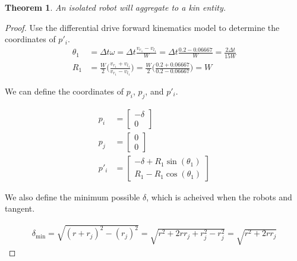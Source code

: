 \documentclass[conference]{IEEEtran}
\newtheorem{theorem}{Theorem}
\begin{document}
  \begin{theorem} \label{thm:aggregation_with_kin}
    An isolated robot will aggregate to a kin entity.
  \end{theorem}
  \begin{proof}
    Use the differential drive forward kinematics model to determine the coordinates of $p'_i$.
    \begin{align} \label{eq:kin_theta_and_r}
      \theta_1 &= \Delta t\omega = \Delta t \frac{v_{r_1} - v_{l_1}}{W} = \Delta t \frac{0.2 - 0.06667}{W} = \frac{2\Delta t}{15W} \\
      R_1 &= \frac{W}{2}\bigg(\frac{v_{r_1} + v_{l_1}}{v_{r_1} - v_{l_1}}\bigg) = \frac{W}{2}\bigg(\frac{0.2 + 0.06667}{0.2 - 0.06667}\bigg) = W
    \end{align}

    We can define the coordinates of $p_i$, $p_j$, and $p'_i$.

    \begin{align} \label{eq:kin_coordinates}
      p_i &= \begin{bmatrix}-\delta \\ 0\end{bmatrix} \\
      p_j &= \begin{bmatrix}0 \\ 0\end{bmatrix} \\
      p'_i &= \begin{bmatrix}-\delta+R_1\sin(\theta_1) \\ R_1-R_1\cos(\theta_1)\end{bmatrix}
    \end{align}

    We also define the minimum possible $\delta$, which is acheived when the robots and tangent.

    \begin{align} \label{eq:min_delta}
      \delta_{\text{min}} = \sqrt{(r + r_j)^2 - (r_j)^2} = \sqrt{r^2 + 2rr_j + r_j^2 - r_j^2} = \sqrt{r^2+2rr_j}
    \end{align}



\end{proof}
\end{document}
